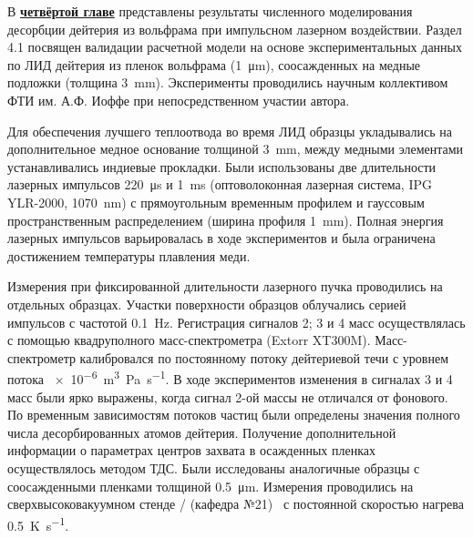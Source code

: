 В \underline{\textbf{четвёртой главе}} представлены результаты численного моделирования десорбции дейтерия из вольфрама при импульсном лазерном воздействии. Раздел 4.1 посвящен валидации расчетной модели на основе экспериментальных данных по ЛИД дейтерия из пленок вольфрама (\SI{1}{\micro\meter}), соосажденных на медные подложки (толщина \SI{3}{\milli\meter}). Эксперименты проводились научным коллективом ФТИ им. А.Ф. Иоффе при непосредственном участии автора. 

Для обеспечения лучшего теплоотвода во время ЛИД образцы укладывались на дополнительное медное основание толщиной \SI{3}{\milli\meter}, между медными элементами устанавливались индиевые прокладки. Были использованы две длительности лазерных импульсов \SI{220}{\micro\second} и \SI{1}{\milli\second} (оптоволоконная лазерная система, IPG YLR-2000, \SI{1070}{\nano\metre}) с прямоугольным временным профилем и гауссовым пространственным распределением (ширина профиля \SI{1}{\milli\meter}). Полная энергия лазерных импульсов варьировалась в ходе экспериментов и была ограничена достижением температуры плавления меди. 

Измерения при фиксированной длительности лазерного пучка проводились на отдельных образцах. Участки поверхности образцов облучались серией импульсов с частотой \SI{0.1}{\hertz}. Регистрация сигналов 2; 3 и 4 масс осуществлялась с помощью квадруполного масс-спектрометра (Extorr XT300M). Масс-спектрометр калибровался по постоянному потоку дейтериевой течи с уровнем потока \SI{e-6}{\metre\cubed\pascal\per\second}. В ходе экспериментов изменения в сигналах 3 и 4 масс были ярко выражены, когда сигнал 2-ой массы не отличался от фонового. По временным зависимостям потоков частиц были определены значения полного числа десорбированных атомов дейтерия. Получение дополнительной информации о параметрах центров захвата в осажденных пленках осуществлялось методом ТДС. Были исследованы аналогичные образцы с соосажденными пленками толщиной \SI{0.5}{\micro\metre}. Измерения проводились на сверхвысоковакуумном стенде \thesisOrganizationShort / (кафедра №21)~\cite{Rusinov2009} с постоянной скоростью нагрева \SI{0.5}{\kelvin\per\second}.

